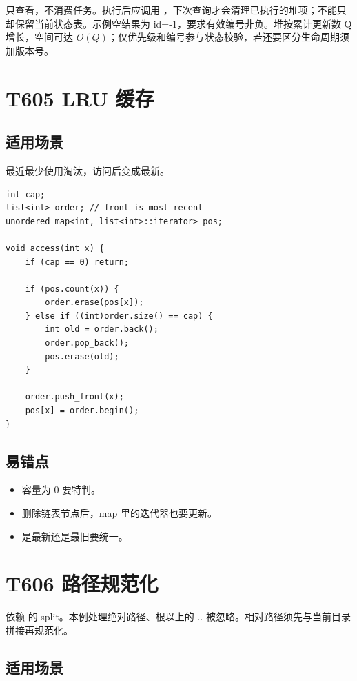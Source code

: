  只查看，不消费任务。执行后应调用 ，下次查询才会清理已执行的堆项；不能只  却保留当前状态表。示例空结果为 id=-1，要求有效编号非负。堆按累计更新数 Q 增长，空间可达 $O(Q)$；仅优先级和编号参与状态校验，若还要区分生命周期须加版本号。

\section{T605 LRU 缓存}\label{sec:09-45}\label{tpl:605}

\subsection{适用场景}

最近最少使用淘汰，访问后变成最新。

\begin{lstlisting}
int cap;
list<int> order; // front is most recent
unordered_map<int, list<int>::iterator> pos;

void access(int x) {
    if (cap == 0) return;

    if (pos.count(x)) {
        order.erase(pos[x]);
    } else if ((int)order.size() == cap) {
        int old = order.back();
        order.pop_back();
        pos.erase(old);
    }

    order.push_front(x);
    pos[x] = order.begin();
}
\end{lstlisting}

\subsection{易错点}

\begin{itemize}
  \item 容量为 0 要特判。
  \item 删除链表节点后，map 里的迭代器也要更新。
  \item {} 是最新还是最旧要统一。
\end{itemize}

\section{T606 路径规范化}\label{sec:09-46}\label{tpl:606}

依赖  的 split。本例处理绝对路径、根以上的 .. 被忽略。相对路径须先与当前目录拼接再规范化。

\subsection{适用场景}

